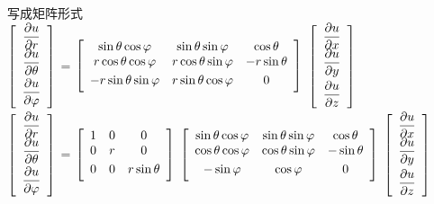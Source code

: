	写成矩阵形式 \\ \vspace{1em}
	{\small $\left[\begin{array}{ccc}
		\dfrac{\partial u}{\partial r} \\ \vspace{0.3em}
		\dfrac{\partial u}{\partial \theta} \\ \vspace{0.3em}
		\dfrac{\partial u}{\partial \varphi}
	\end{array}\right]$
	=
	$\left[\begin{array}{ccc}
		\sin \theta \cos \varphi & \sin \theta \sin \varphi & \cos \theta \\ \vspace{0.3em}
		r \cos \theta \cos \varphi & r \cos \theta \sin \varphi & -r \sin \theta \\ \vspace{0.3em}
		-r \sin \theta \sin \varphi & r \sin \theta \cos \varphi & 0
	\end{array}\right]$
	$\left[\begin{array}{ccc}
		\dfrac{\partial u}{\partial x} \\ \vspace{0.3em}
		\dfrac{\partial u}{\partial y} \\ \vspace{0.3em}
		\dfrac{\partial u}{\partial z}
	\end{array}\right]$
	}\\
	{\small $\left[\begin{array}{ccc}
		\dfrac{\partial u}{\partial r} \\ \vspace{0.3em}
		\dfrac{\partial u}{\partial \theta} \\ \vspace{0.3em}
		\dfrac{\partial u}{\partial \varphi}
	\end{array}\right]$
	=
	$\left[\begin{array}{ccc}
		1 & 0 & 0 \\ \vspace{0.3em}
		0 & r  & 0 \\ \vspace{0.3em}
		0 & 0 & r \sin \theta 
	\end{array}\right]$
	$\left[\begin{array}{ccc}
		\sin \theta \cos \varphi & \sin \theta \sin \varphi & \cos \theta \\ \vspace{0.3em}
		\cos \theta \cos \varphi & \cos \theta \sin \varphi & - \sin \theta \\ \vspace{0.3em}
		-\sin \varphi &  \cos \varphi & 0
	\end{array}\right]$
	$\left[\begin{array}{ccc}
		\dfrac{\partial u}{\partial x} \\ \vspace{0.3em}
		\dfrac{\partial u}{\partial y} \\ \vspace{0.3em}
		\dfrac{\partial u}{\partial z}
	\end{array}\right]$
	}
	


